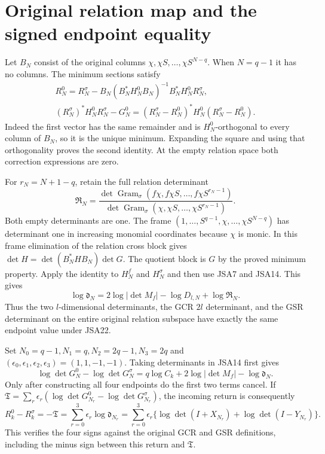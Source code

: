 \documentclass[11pt,a4paper]{article}
\newcommand{\Gr}{\operatorname{Gram}}
\begin{document}
\section{Original relation map and the signed endpoint equality}

Let $B_N$ consist of the original columns
$\chi,\chi S,\ldots,\chi S^{N-q}$. When $N=q-1$ it has no
columns. The minimum sections satisfy
\[
\begin{gathered}
 R_N^0=R_N^\sigma-
 B_N(B_N^*H_N^0B_N)^{-1}B_N^*H_N^0R_N^\sigma,\\
 (R_N^\sigma)^*H_N^0R_N^\sigma-G_N^0
  =(R_N^\sigma-R_N^0)^*H_N^0(R_N^\sigma-R_N^0).
\end{gathered}\tag{JSA20}
\]
Indeed the first vector has the same remainder and is
$H_N^0$-orthogonal to every column of $B_N$, so it is the
unique minimum. Expanding the square and using that
orthogonality proves the second identity. At the empty
relation space both correction expressions are zero.

For $r_N=N+1-q$, retain the full relation determinant
\[
 \mathfrak R_N=
 \frac{\det\Gr_\sigma(f\chi,f\chi S,\ldots,f\chi S^{r_N-1})}
      {\det\Gr_\sigma(\chi,\chi S,\ldots,\chi S^{r_N-1})}.
\tag{JSA21}
\]
Both empty determinants are one. The frame
$(1,\ldots,S^{q-1},\chi,\ldots,\chi S^{N-q})$ has determinant
one in increasing monomial coordinates because $\chi$ is monic.
In this frame elimination of the relation cross block gives
$\det H=\det(B_N^*HB_N)\det G$. The quotient block is $G$
by the proved minimum property. Apply the identity to $H_N^f$
and $H_N^\sigma$ and then use JSA7 and JSA14. This gives
\[
 \log\mathfrak d_N
   =2\log|\det M_f|-\log D_{l,N}+\log\mathfrak R_N.
\tag{JSA22}
\]
Thus the two $l$-dimensional determinants, the GCR $2l$ determinant,
and the GSR determinant on the entire original relation subspace
have exactly the same endpoint value under JSA22.

Set $N_0=q-1,N_1=q,N_2=2q-1,N_3=2q$ and
$(\epsilon_0,\epsilon_1,\epsilon_2,\epsilon_3)=(1,1,-1,-1)$.
Taking determinants in JSA14 first gives
\[
 \log\det G_N^0-\log\det G_N^\sigma
  =q\log C_k+2\log|\det M_f|-\log\mathfrak d_N.
\tag{JSA23}
\]
Only after constructing all four endpoints do the first two
terms cancel. If $\mathfrak T=\sum_r\epsilon_r
(\log\det G_{N_r}^0-\log\det G_{N_r}^\sigma)$, the incoming
return is consequently
\[
 R_k^0-R_k^\sigma=-\mathfrak T
  =\sum_{r=0}^3\epsilon_r\log\mathfrak d_{N_r}
  =\sum_{r=0}^3\epsilon_r
       \{\log\det(I+X_{N_r})+\log\det(I-Y_{N_r})\}.
\tag{JSA24}
\]
This verifies the four signs against the original GCR and GSR
definitions, including the minus sign between this return and
$\mathfrak T$.
\end{document}
